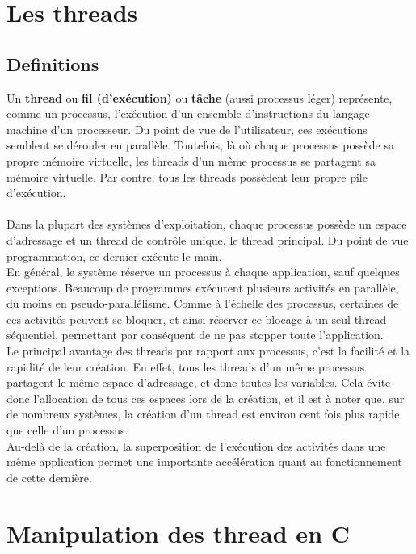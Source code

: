 \section{Les threads}

	\subsection{Definitions}
		Un \textbf{thread} ou \textbf{fil (d'exécution)} ou \textbf{tâche} (aussi processus léger) représente, comme un processus, l'exécution d'un ensemble d'instructions du langage machine d'un processeur. Du point de vue de l'utilisateur, ces exécutions semblent se dérouler en parallèle. Toutefois, là où chaque processus possède sa propre mémoire virtuelle, les threads d'un même processus se partagent sa mémoire virtuelle. Par contre, tous les threads possèdent leur propre pile d'exécution.
		
		\paragraph{} Dans la plupart des systèmes d'exploitation, chaque processus possède un espace d'adressage et un thread de contrôle unique, le thread principal. Du point de vue programmation, ce dernier exécute le main.\\
		En général, le système réserve un processus à chaque application, sauf quelques exceptions. Beaucoup de programmes exécutent plusieurs activités en parallèle, du moins en pseudo-parallélisme. Comme à l'échelle des processus, certaines de ces activités peuvent se bloquer, et ainsi réserver ce blocage à un seul thread séquentiel, permettant par conséquent de ne pas stopper toute l'application.\\
		Le principal avantage des threads par rapport aux processus, c'est la facilité et la rapidité de leur création. En effet, tous les threads d'un même processus partagent le même espace d'adressage, et donc toutes les variables. Cela évite donc l'allocation de tous ces espaces lors de la création, et il est à noter que, sur de nombreux systèmes, la création d'un thread est environ cent fois plus rapide que celle d'un processus.\\
		Au-delà de la création, la superposition de l'exécution des activités dans une même application permet une importante accélération quant au fonctionnement de cette dernière.
	
	\section{Manipulation des thread en C}
		
